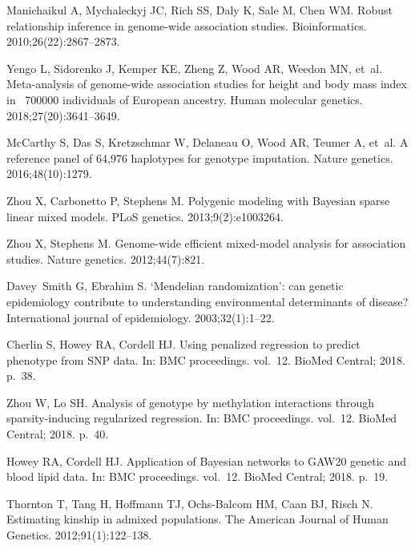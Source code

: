 \documentclass[10pt,letterpaper]{article}
\begin{document}
\begin{thebibliography}{10}
	Manichaikul A, Mychaleckyj JC, Rich SS, Daly K, Sale M, Chen WM.
	\newblock Robust relationship inference in genome-wide association studies.
	\newblock Bioinformatics. 2010;26(22):2867--2873.
	
	Yengo L, Sidorenko J, Kemper KE, Zheng Z, Wood AR, Weedon MN, et~al.
	\newblock Meta-analysis of genome-wide association studies for height and body
	mass index in~ 700000 individuals of European ancestry.
	\newblock Human molecular genetics. 2018;27(20):3641--3649.
	
	McCarthy S, Das S, Kretzschmar W, Delaneau O, Wood AR, Teumer A, et~al.
	\newblock A reference panel of 64,976 haplotypes for genotype imputation.
	\newblock Nature genetics. 2016;48(10):1279.
	
	Zhou X, Carbonetto P, Stephens M.
	\newblock Polygenic modeling with Bayesian sparse linear mixed models.
	\newblock PLoS genetics. 2013;9(2):e1003264.
	
	Zhou X, Stephens M.
	\newblock Genome-wide efficient mixed-model analysis for association studies.
	\newblock Nature genetics. 2012;44(7):821.
	
	Davey~Smith G, Ebrahim S.
	\newblock ‘Mendelian randomization’: can genetic epidemiology contribute to
	understanding environmental determinants of disease?
	\newblock International journal of epidemiology. 2003;32(1):1--22.
	
	Cherlin S, Howey RA, Cordell HJ.
	\newblock Using penalized regression to predict phenotype from SNP data.
	\newblock In: BMC proceedings. vol.~12. BioMed Central; 2018. p.~38.
	
	Zhou W, Lo SH.
	\newblock Analysis of genotype by methylation interactions through
	sparsity-inducing regularized regression.
	\newblock In: BMC proceedings. vol.~12. BioMed Central; 2018. p.~40.
	
	Howey RA, Cordell HJ.
	\newblock Application of Bayesian networks to GAW20 genetic and blood lipid
	data.
	\newblock In: BMC proceedings. vol.~12. BioMed Central; 2018. p.~19.
	
	Thornton T, Tang H, Hoffmann TJ, Ochs-Balcom HM, Caan BJ, Risch N.
	\newblock Estimating kinship in admixed populations.
	\newblock The American Journal of Human Genetics. 2012;91(1):122--138.
	

\end{thebibliography}
\end{document}
